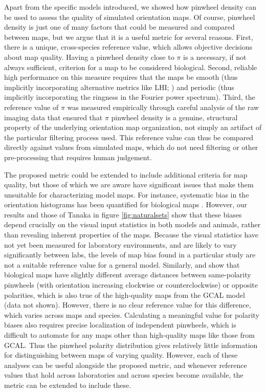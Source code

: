 \documentclass{article}
\begin{document}
Apart from the specific models introduced, we showed how pinwheel
density can be used to assess the quality of simulated orientation
maps.  Of course, pinwheel density is just one of many factors that
could be measured and compared between maps, but we argue that it is
a useful metric for several reasons.  First, there is a unique,
cross-species reference value, which allows objective decisions about
map quality.  Having a pinwheel density close to $\pi$ is a
necessary, if not always sufficient, criterion for a map to be
considered biological.  Second, reliable high
performance on this measure requires that the maps be smooth (thus
implicitly incorporating alternative metrics like LHI;
\citealp{Nauhaus2008}) and periodic (thus implicitly incorporating
the ringness in the Fourier power spectrum). Third, the
reference value of $\pi$ was measured empirically through careful
analysis of the raw imaging data that ensured that $\pi$ pinwheel
density is a genuine, structural property of the underlying
orientation map organization, not simply an artifact of the particular
filtering process used.  This reference value can thus be compared
directly against values from simulated maps, which do not need
filtering or other pre-processing that requires human judgement.

The proposed metric could be extended to include additional criteria
for map quality, but those of which we are aware have significant
issues that make them unsuitable for characterizing model maps. For
instance, systematic bias in the orientation histograms has been
quantified for biological maps \citep{Muller2000,coppola:pnas98}.
However, our results and those of Tanaka in figure
\ref{fig:naturalsets} show that these biases depend crucially on the
visual input statistics in both models and animals, rather than
revealing inherent properties of the maps.  Because the visual
statistics have not yet been measured for laboratory environments,
and are likely to vary significantly between labs, the levels of map
bias found in a particular study are not a suitable reference value
for a general model.  Similarly, \citet{Muller2000} and
\citet{Kaschube2010} show that biological maps have slightly different
average distances between same-polarity pinwheels (with orientation
increasing clockwise or counterclockwise) or opposite polarities,
which is also true of the high-quality maps from the GCAL model
(data not shown).  However, there is no clear reference value for
this difference, which varies across maps and species.  Calculating
a meaningful value for polarity biases also requires precise
localization of independent pinwheels, which is difficult to
automate for any maps other than high-quality maps like those from
GCAL.  Thus the pinwheel polarity distribution gives relatively
little information for distinguishing between maps of varying
quality.  However, each of these analyses can be useful alongside
the proposed metric, and whenever reference values that hold across
laboratories and across species become available, the metric can be
extended to include these.
\end{document}
